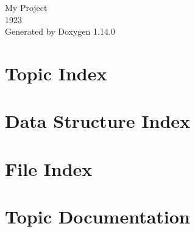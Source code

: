 \documentclass[twoside]{book}
\newcommand{\+}{\discretionary{\mbox{\scriptsize$\hookleftarrow$}}{}{}}
\newcommand{\clearemptydoublepage}{%
    \newpage{\pagestyle{empty}\cleardoublepage}%
  }
\begin{document}
  \raggedbottom
    \hypersetup{pageanchor=false,
                bookmarksnumbered=true,
                pdfencoding=unicode
               }
  \begin{titlepage}
  \vspace*{7cm}
  \begin{center}%
  {\Large My Project}\\
  [1ex]\large 1923 \\
  \vspace*{1cm}
  {\large Generated by Doxygen 1.14.0}\\
  \end{center}
  \end{titlepage}
  \clearemptydoublepage
  \tableofcontents
  \clearemptydoublepage
  \hypersetup{pageanchor=true}
\chapter{Topic Index}

\chapter{Data Structure Index}

\chapter{File Index}

\chapter{Topic Documentation}






\end{document}
